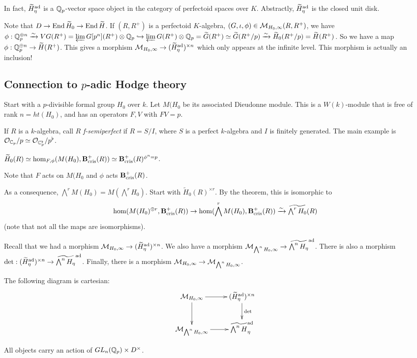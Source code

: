 In fact, $\widetilde H_\eta^{\textnormal{ad}}$ is a $\mathbb{Q}_p$-vector space object in the category 
of perfectoid spaces over $K$. Abstractly, $\widetilde H_\eta^{\textnormal{ad}}$ is the closed 
unit disk. 

Note that $D\to \operatorname{End} \widetilde H_0 \to \operatorname{End}\widetilde H$. If $(R,R^+)$ is a 
perfectoid $K$-algebra, $(G,\iota,\phi)\in \mathcal{M}_{H_0,\infty}(R,R^+)$, we have 
$\phi:\mathbb{Q}_p^{\oplus n} \xrightarrow\sim V G(R^+) = \varprojlim G[p^n](R^+)\otimes \mathbb{Q}_p \hookrightarrow \varprojlim G(R^+) \otimes \mathbb{Q}_p = \widetilde G(R^+) \simeq \widetilde G(R^+/p)\xrightarrow\sim \widetilde H_0(R^+/p) = \widetilde H(R^+)$. 
So we have a map $\phi:\mathbb{Q}_p^{\oplus n} \to \widetilde H(R^+)$. This gives a 
morphism $\mathcal{M}_{H_0,\infty} \to (\widetilde H_\eta^{\textnormal{ad}})^{\times n}$ which only 
appears at the infinite level. This morphism is actually an inclusion! 






\subsection{Connection to $p$-adic Hodge theory}

Start with a $p$-divisible formal group $H_0$ over $k$. Let $M(H_0$ be its 
associated Dieudonne module. This is a $W(k)$-module that is free of rank 
$n=ht(H_0)$, and has an operators $F,V$ with $F V=p$. 

If $R$ is a $k$-algebra, call $R$ \emph{f-semiperfect} if 
$R=S/I$, where $S$ is a perfect $k$-algebra and $I$ is finitely generated. The 
main example is $\mathcal{O}_{\mathbb{C}_p} / p \simeq \mathcal{O}_{\mathbb{C}_p^\flat} / p^\flat$. 

\begin{theorem}
$\widetilde H_0(R) \simeq \hom_{F,\phi}(M(H_0),\mathbf{B}_\textnormal{cris}^+(R)) \simeq \mathbf{B}_\textnormal{cris}^+(R)^{\phi^n=p}$. 
\end{theorem}


Note that $F$ acts on $M(H_0$ and $\phi$ acts $\mathbf{B}_\textnormal{cris}^+(R)$. 

As a consequence, $\bigwedge^r M(H_0) = M(\bigwedge^r H_0)$. Start with 
$\widetilde H_0(R)^{\times r}$. By the theorem, this is isomorphic to 
\[
  \hom(M(H_0)^{\oplus r}, \mathbf{B}_\textnormal{cris}^+(R)) \to \hom(\bigwedge^r M(H_0), \mathbf{B}_\textnormal{cris}^+(R)) \xrightarrow\sim \widetilde{\textstyle\bigwedge^r H_0}(R) 
\]
(note that not all the maps are isomorphisms). 

Recall that we had a morphism $\mathcal{M}_{H_0,\infty} \to (\widetilde H_\eta^{\textnormal{ad}})^{\times n}$. 
We also have a morphism $\mathcal{M}_{\bigwedge^n H_0,\infty} \to \widetilde{\bigwedge^n H_\eta}^{\textnormal{ad}}$. There is also a morphism 
$\det:(\widetilde H_\eta^{\textnormal{ad}})^{\times n} \to \widetilde{\bigwedge^n H_\eta}^{\textnormal{ad}}$. 
Finally, there is a morphism $\mathcal{M}_{H_0,\infty} \to \mathcal{M}_{\bigwedge^n H_0,\infty}$. 

\begin{theorem}
The following diagram is cartesian:
\[\xymatrix{
  \cM_{H_0,\infty} \ar[r] \ar[d] 
    & (\widetilde H_\eta^\ad)^{\times n} \ar[d]^-{\det} \\
  \cM_{\bigwedge^n H_0,\infty} \ar[r] 
    & \widetilde{\textstyle\bigwedge^n H}_\eta^\ad 
}\]
\end{theorem}

All objects carry an action of $GL_n(\mathbb{Q}_p)\times D^\times$. 
